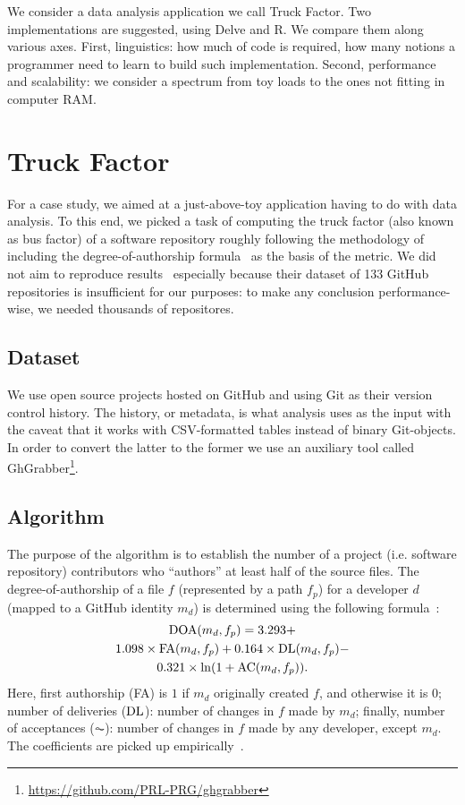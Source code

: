 We consider a data analysis application we call Truck Factor.
Two implementations are suggested, using Delve and R. We compare them
along various axes. First, linguistics: how much of code is required,
how many notions a programmer need to learn to build such implementation.
Second, performance and scalability: we consider a spectrum from 
toy loads to the ones not fitting in computer RAM.

\section{Truck Factor}

For a case study, we aimed at a just-above-toy application having to 
do with data analysis. To this end, we picked a task of computing the 
truck factor (also known as bus factor) of a software repository 
roughly following the methodology of~\cite{tf} including the 
degree-of-authorship formula~\cite{doa} as the basis of the metric. 
We did not aim to reproduce results~\cite{tf} 
especially because their dataset of 133 GitHub repositories is insufficient
for our purposes: to make any conclusion performance-wise, we needed
thousands of repositores.

\subsection{Dataset}

We use open source projects hosted on GitHub and using Git as their 
version control history. The history, or metadata, is what analysis
uses as the input with the caveat that it works with CSV-formatted 
tables instead of binary Git-objects. In order to convert the latter 
to the former we use an auxiliary tool called
GhGrabber\footnote{\url{https://github.com/PRL-PRG/ghgrabber}}.

\subsection{Algorithm}

The purpose of the algorithm is to establish the number of a project
(i.e. software repository) contributors who ``authors'' at least half of
the source files. The degree-of-authorship of a file $f$ (represented
by a path $f_p$)
for a developer $d$ (mapped to a GitHub identity $m_d$)
is determined using the following formula~\cite{tf}:
\begin{multline}
\operatorname{DOA}(m_d, f_p) =
  3.293 + \\
  1.098\times \operatorname{FA}(m_d, f_p) +
  0.164\times \operatorname{DL}(m_d, f_p) - \\
  0.321\times \ln(1 + \operatorname{AC}(m_d, f_p)).
\end{multline}
Here, first authorship (FA) is $1$ if $m_d$ originally created $f$, and 
otherwise it is $0$; number of deliveries ($\operatorname{DL}$): number of changes in $f$
made by $m_d$; finally, number of acceptances ($\AC$): number of 
changes in $f$ made by any developer, except $m_d$. The coefficients
are picked up empirically~\cite{doa}.

